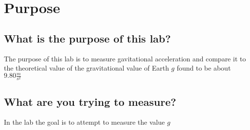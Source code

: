 \chapter{Purpose}
\section{What is the purpose of this lab?}
The purpose of this lab is to measure gavitational acceleration and compare it to the theoretical value
of the gravitational value of Earth $g$ found to be about $9.80\frac{m}{s^2}$
\section{What are you trying to measure?}
In the lab the goal is to attempt to measure the value $g$
